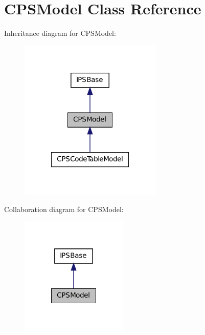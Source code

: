 \hypertarget{classCPSModel}{
\section{CPSModel Class Reference}
\label{classCPSModel}
}


Inheritance diagram for CPSModel:\nopagebreak
\begin{figure}[H]
\begin{center}
\leavevmode
\includegraphics[width=192pt]{classCPSModel__inherit__graph}
\end{center}
\end{figure}


Collaboration diagram for CPSModel:\nopagebreak
\begin{figure}[H]
\begin{center}
\leavevmode
\includegraphics[width=144pt]{classCPSModel__coll__graph}
\end{center}
\end{figure}
